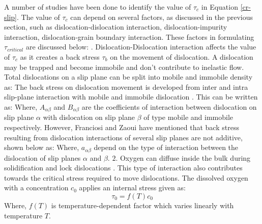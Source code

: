 A number of studies \cite{sumino1999deformation,franciosi1982multislip,cochard2013novel} have been done to identify the value of $\tau_{c}$ in Equation \ref{cr-slip}. The value of $\tau_{c}$ can depend on several factors, as discussed in the previous section, such as dislocation-dislocation interaction, dislocation-impurity interaction, dislocation-grain boundary interaction. 
These factors in formulating $\tau_{critical}$ are discussed below:
. Dislocation-Dislocation interaction affects the value of $\tau_{c}$ as it creates a back stress $\tau_{b}$ on the movement of dislocation. A dislocation may be trapped and become immobile and don't contribute to inelastic flow. Total dislocations on a slip plane can be split into mobile and immobile density as:
The back stress on dislocation movement is developed from inter and intra slip-plane interaction with mobile and immobile dislocation \cite{cochard2013novel}. This can be written as: 
Where, $A_{\alpha \beta}$ and $B_{\alpha \beta}$ are the coefficients of interaction between dislocation on slip plane $\alpha$ with dislocation on slip plane $\beta$ of type mobile and immobile respectively. However, Franciosi and Zaoui \cite{franciosi1982multislip} have mentioned that back stress resulting from dislocation interactions of several slip planes are not additive, shown below as:
Where, $a_{\alpha \beta}$ depend on the type of interaction between the dislocation of slip planes $\alpha$ and $\beta$.
\newline
\newline
$2.$ Oxygen can diffuse inside the bulk during solidification and lock dislocations \cite{sumino1983interaction}. This type of interaction also contributes towards the critical stress required to move dislocations. The dissolved oxygen with a concentration $c_{0}$ applies an internal stress given as:
\begin{equation}
\tau_{0} = f(T) c_{0}
\label {d-d-i4}
\end{equation}
Where, $f(T)$ is temperature-dependent factor which varies linearly with temperature $T$.

